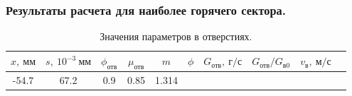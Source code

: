 \documentclass[a4paper,12pt]{article}
\begin{document}
    \subsubsection{Результаты расчета для наиболее горячего сектора.}
%    
    \begin{longtable}{
     |
%    
    c|
%    
    c|
%    
    c|
%    
    c|
%    
    c|
%    
    c|
%    
    c|
%    
    c|
%    
    c|
%    
    c|
%    
    }
        \caption{Значения параметров в отверстиях.} \\
        \hline
%        

%        
        $x,\ мм$
%        

%        

%        
        & $s,\ 10^{-3}\ мм$
%        

%        

%        
        & $\phi_{отв}$
%        

%        

%        
        & $\mu_{отв}$
%        

%        

%        
        & $m$
%        

%        

%        
        & $\phi$
%        

%        

%        
        & $G_{отв},\ г/с$
%        

%        

%        
        & $G_{отв}/G_{в0}$
%        

%        

%        
        & $v_в,\ м/с$
%        

%        
        \\
        \hline

%        

%        

%        
        -54.7
%        

%        

%        
        & 67.2
%        

%        

%        
        & 0.9
%        

%        

%        
        & 0.85
%        

%        

%        
        & 1.314
%        

%        


\end{longtable}
\end{document}
